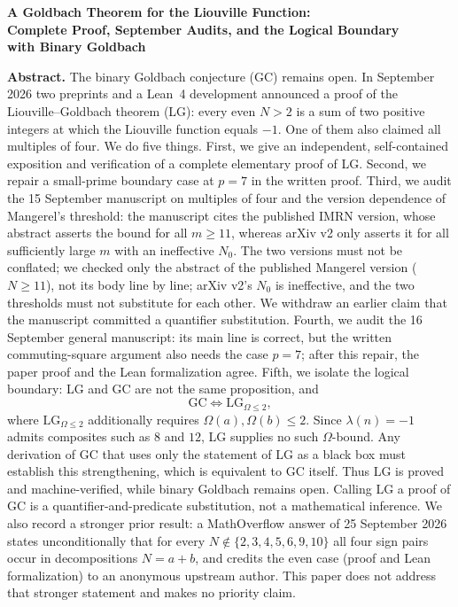 \documentclass[11pt,a4paper]{ctexart}
\theoremstyle{plain}
\theoremstyle{definition}
\newcommand{\li}{\lambda}
\newcommand{\Om}{\Omega}
\newcommand{\GC}{\mathrm{GC}}
\newcommand{\LGtwo}{\mathrm{LG}_{\Om\le2}}
\begin{document}
\newpage
\begin{center}
{\large\bfseries A Goldbach Theorem for the Liouville Function:\\[2pt]
Complete Proof, September Audits, and the Logical Boundary\\[2pt]
with Binary Goldbach}
\end{center}

\noindent\textbf{Abstract.}
The binary Goldbach conjecture (GC) remains open. In September 2026 two preprints and a Lean~4 development announced a proof of the Liouville--Goldbach theorem (LG): every even $N>2$ is a sum of two positive integers at which the Liouville function equals $-1$. One of them also claimed all multiples of four. We do five things. First, we give an independent, self-contained exposition and verification of a complete elementary proof of LG. Second, we repair a small-prime boundary case at $p=7$ in the written proof. Third, we audit the 15 September manuscript on multiples of four and the version dependence of Mangerel's threshold: the manuscript cites the published IMRN version, whose abstract asserts the bound for all $m\ge11$, whereas arXiv v2 only asserts it for all sufficiently large $m$ with an ineffective $N_0$. The two versions must not be conflated; we checked only the abstract of the published Mangerel version ($N\ge11$), not its body line by line; arXiv v2's $N_0$ is ineffective, and the two thresholds must not substitute for each other. We withdraw an earlier claim that the manuscript committed a quantifier substitution. Fourth, we audit the 16 September general manuscript: its main line is correct, but the written commuting-square argument also needs the case $p=7$; after this repair, the paper proof and the Lean formalization agree. Fifth, we isolate the logical boundary: LG and GC are not the same proposition, and
\[
  \GC\iff\LGtwo,
\]
where $\LGtwo$ additionally requires $\Om(a),\Om(b)\le2$. Since $\li(n)=-1$ admits composites such as $8$ and $12$, LG supplies no such $\Om$-bound. Any derivation of GC that uses only the statement of LG as a black box must establish this strengthening, which is equivalent to GC itself. Thus LG is proved and machine-verified, while binary Goldbach remains open. Calling LG a proof of GC is a quantifier-and-predicate substitution, not a mathematical inference. We also record a stronger prior result: a MathOverflow answer of 25 September 2026 states unconditionally that for every $N\notin\{2,3,4,5,6,9,10\}$ all four sign pairs occur in decompositions $N=a+b$, and credits the even case (proof and Lean formalization) to an anonymous upstream author. This paper does not address that stronger statement and makes no priority claim.
\end{document}
